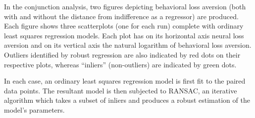 
\par In the conjunction analysis, two figures depicting behavioral loss aversion
(both with and without the distance from indifference as a regressor) are
produced. Each figure shows three scatterplots (one for each run) complete with
ordinary least squares regression models. Each plot has on its horizontal axis
neural loss aversion and on its vertical axis the natural logarithm of
behavioral loss aversion. Outliers identified by robust regression are also
indicated by red dots on their respective plots, whereas ``inliers''
(non-outliers) are indicated by green dots.

\par \indent In each case, an ordinary least squares regression model is first
fit to the paired data points. The resultant model is then subjected to RANSAC,
an iterative algorithm which takes a subset of inliers and produces a robust
estimation of the model's parameters.

